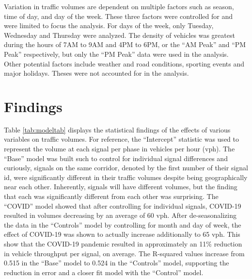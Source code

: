 \documentclass[3p, authoryear]{elsarticle} %
\begin{document}
Variation in traffic volumes are dependent on multiple factors such as season, time of day, and day of the week. These three factors were controlled for and were limited to focus the analysis. For days of the week, only Tuesday, Wednesday and Thursday were analyzed. The density of vehicles was greatest during the hours of 7AM to 9AM and 4PM to 6PM, or the ``AM Peak'' and ``PM Peak'' respectively, but only the ``PM Peak'' data were used in the analysis. Other potential factors include weather and road conditions, sporting events and major holidays. Theses were not accounted for in the analysis.

\hypertarget{findings}{%
\section{Findings}\label{findings}}

Table \ref{tab:modeltab} displays the statistical findings of the effects of various variables on traffic volumes. For reference, the ``Intercept'' statistic was used to represent the volume at each signal per phase in vehicles per hour (vph). The ``Base'' model was built such to control for individual signal differences and curiously, signals on the same corridor, denoted by the first number of their signal id, were significantly different in their traffic volumes despite being geographically near each other. Inherently, signals will have different volumes, but the finding that each was significantly different from each other was surprising. The ``COVID'' model showed that after controlling for individual signals, COVID-19 resulted in volumes decreasing by an average of 60 vph. After de-seasonalizing the data in the ``Controls'' model by controlling for month and day of week, the effect of COVID-19 was shown to actually increase additionally to 65 vph. This show that the COVID-19 pandemic resulted in approximately an 11\% reduction in vehicle throughput per signal, on average. The R-squared values increase from 0.515 in the ``Base'' model to 0.524 in the ``Controls'' model, supporting the reduction in error and a closer fit model with the ``Control'' model.
\end{document}
